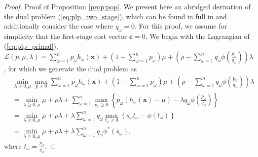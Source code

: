 \documentclass[12pt]{article}
\newcommand{\x}{\mathbf{x}}
\renewcommand{\c}{\mathbf{c}}
\theoremstyle{plain}
\theoremstyle{definition}
\theoremstyle{remark}
\begin{document}
\begin{proof}{\sc Proof of Proposition \ref{prop:pop}.}
	We present here an abridged derivation of the dual problem (\ref{eq:plp_two_stage}), which can be found in full in \citep{bental2011robust} and additionally consider the case where $q_\omega = 0$.
	For this proof, we assume for simplicity that the first-stage cost vector $\c = 0$.	
	We begin with the Lagrangian of (\ref{eq:plp_primal}), $\mathcal{L}(p,\mu,\lambda) = \sum_{\omega=1}^n p_\omega h_\omega(\x) + \left( 1-\sum_{\omega=1}^n p_\omega \right)\mu + \left( \rho - \sum_{\omega=1}^n q_\omega \phi\left(\frac{p_\omega}{q_\omega}\right) \right)\lambda$, for which we generate the dual problem as
	\begin{align}
		 & \min_{\lambda \geq 0, \mu} \max_{p \geq 0} \sum_{\omega=1}^n p_\omega h_\omega(\x) + \left( 1-\sum_{\omega=1}^n p_\omega \right)\mu + \left( \rho - \sum_{\omega=1}^n q_\omega \phi\left(\frac{p_\omega}{q_\omega}\right) \right)\lambda \nonumber \\
		& = \min_{\lambda \geq 0, \mu} \mu + \rho\lambda + \sum_{\omega=1}^n \max_{p_\omega \geq 0} \left\{ p_\omega (h_\omega(\x) - \mu) - \lambda q_\omega \phi\left(\frac{p_\omega}{q_\omega}\right) \right\} \label{eq:pop_proof_detail_1} \\
		& =  \min_{\lambda \geq 0, \mu} \mu + \rho\lambda + \lambda \sum_{\omega=1}^n q_\omega \max_{t_\omega \geq 0} \left\{ s_\omega t_\omega - \phi(t_\omega) \right\} \label{eq:pop_proof_detail_2} \\
		& = \min_{\lambda \geq 0, \mu} \mu + \rho\lambda + \lambda \sum_{\omega=1}^n q_\omega \phi^*\left(s_\omega\right), \nonumber
	\end{align}
	where $t_\omega = \frac{p_\omega}{q_\omega}$.
	

\end{proof}
\end{document}
